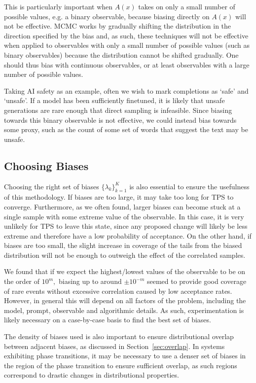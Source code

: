 \documentclass{article}
\begin{document}
This is particularly important when $A(x)$ takes on only a small number of possible values, e.g. a binary observable, because biasing directly on $A(x)$ will not be effective.
MCMC works by gradually shifting the distribution in the direction specified by the bias and, as such, these techniques will not be effective when applied to observables with only a small number of possible values (such as binary observables)
because the distribution cannot be shifted gradually. One should thus bias with continuous observables, or at least observables with a large number of possible values.

Taking AI safety as an example, often we wish to mark completions as `safe' and `unsafe'. If a model has been sufficiently finetuned, it is likely that unsafe generations are rare enough that direct sampling is infeasible.
Since biasing towards this binary observable is not effective, we could instead bias towards some proxy, such as the count of some set of words that suggest the text may be unsafe.

\subsection{Choosing Biases}
Choosing the right set of biases $\{\lambda_k\}_{k=1}^K$ is also essential to ensure the usefulness of this methodology.
If biases are too large, it may take too long for TPS to converge.
Furthermore, as we often found, larger biases can become stuck at a single sample with some extreme value of the observable.
In this case, it is very unlikely for TPS to leave this state, since any proposed change will likely be less extreme and therefore have a low probability of acceptance.
On the other hand, if biases are too small, the slight increase in coverage of the tails from the biased distribution will not be enough to outweigh the effect of the correlated samples.

We found that if we expect the highest/lowest values of the observable to be on the order of $10^m,$ biasing up to around $\pm 10^{-m}$ seemed to provide good coverage of rare events without excessive correlation caused by low acceptance rates.
However, in general this will depend on all factors of the problem, including the model, prompt, observable and algorithmic details.
As such, experimentation is likely necessary on a case-by-case basis to find the best set of biases.

The density of biases used is also important to ensure distributional overlap between adjacent biases, as discussed in Section~\ref{sec:overlap}.
In systems exhibiting phase transitions, it may be necessary to use a denser set of biases in the region of the phase transition to ensure sufficient overlap, as such regions correspond to drastic changes in distributional properties.
\end{document}
